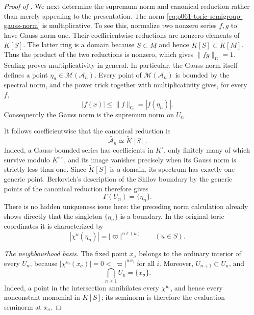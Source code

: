 \begin{proof}[Proof of ]
We next determine the supremum norm and canonical reduction rather than
merely appealing to the presentation.  The norm
\eqref{eq:p061-toric-semigroup-gauss-norm} is multiplicative.  To see
this, normalize two nonzero series \(f,g\) to have Gauss norm one.  Their
coefficientwise reductions are nonzero elements of
\(\widetilde K[S]\).  The latter ring is a domain because \(S\subset M\)
and hence \(\widetilde K[S]\subset\widetilde K[M]\).  Thus the product of
the two reductions is nonzero, which gives
\(\|fg\|_{\mathrm G}=1\).  Scaling proves multiplicativity in general.
In particular, the Gauss norm itself defines a point
\(\eta_n\in\mathcal M(\mathscr A_n)\).  Every point of
\(\mathcal M(\mathscr A_n)\) is bounded by the spectral norm, and the
power trick together with multiplicativity gives, for every \(f\),
\[
       |f(x)|\leq\|f\|_{\mathrm G}=|f(\eta_n)|.
\]
Consequently the Gauss norm is the supremum norm on \(U_n\).

It follows coefficientwise that the canonical reduction is
\begin{equation}
\label{eq:p061-toric-canonical-reduction}
             \widetilde{\mathscr A_n}\simeq\widetilde K[S].
\end{equation}
Indeed, a Gauss-bounded series has coefficients in \(K^{\circ}\), only
finitely many of which survive modulo \(K^{\circ\circ}\), and its image
vanishes precisely when its Gauss norm is strictly less than one.  Since
\(\widetilde K[S]\) is a domain, its spectrum has exactly one generic
point.  Berkovich's description of the Shilov boundary by the generic
points of the canonical reduction
\cite[Proposition~2.4.4]{Berk12} therefore gives
\begin{equation}
\label{eq:p061-toric-singleton-shilov}
                    \Gamma(U_n)=\{\eta_n\}.
\end{equation}
There is no hidden uniqueness issue here: the preceding norm calculation
already shows directly that the singleton \(\{\eta_n\}\) is a boundary.
In the original toric coordinates it is characterized by
\begin{equation}
\label{eq:p061-toric-weighted-gauss-point}
       |\chi^u(\eta_n)|=|\varpi|^{n\ell(u)}
       \qquad(u\in S).
\end{equation}

\smallskip
\noindent
\emph{The neighbourhood basis.}
The fixed point \(x_{\sigma}\) belongs to the ordinary interior of every
\(U_n\), because
\(|\chi^{u_i}(x_{\sigma})|=0<|\varpi|^{nw_i}\) for all \(i\).  Moreover,
\(U_{n+1}\subset U_n\), and
\begin{equation}
\label{eq:p061-toric-intersection}
                    \bigcap_{n\geq1}U_n=\{x_{\sigma}\}.
\end{equation}
Indeed, a point in the intersection annihilates every \(\chi^{u_i}\),
and hence every nonconstant monomial in \(K[S]\); its seminorm is therefore
the evaluation seminorm at \(x_{\sigma}\).


\end{proof}
